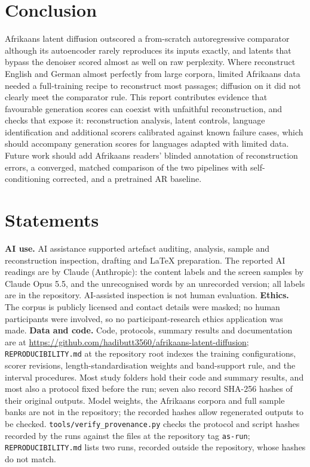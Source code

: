 \documentclass[11pt,a4paper]{article}
\begin{document}
\section{Conclusion}
\label{sec:conclusion}

Afrikaans latent diffusion outscored a from-scratch autoregressive comparator although its autoencoder rarely reproduces its inputs exactly, and latents that bypass the denoiser scored almost as well on raw perplexity. Where \citet{lovelace2023latent} reconstruct English and German almost perfectly from large corpora, limited Afrikaans data needed a full-training recipe to reconstruct most passages; diffusion on it did not clearly meet the comparator rule. This report contributes evidence that favourable generation scores can coexist with unfaithful reconstruction, and checks that expose it: reconstruction analysis, latent controls, language identification and additional scorers calibrated against known failure cases, which should accompany generation scores for languages adapted with limited data. Future work should add Afrikaans readers' blinded annotation of reconstruction errors, a converged, matched comparison of the two pipelines with self-conditioning corrected, and a pretrained AR baseline.

\section*{Statements}
\textbf{AI use.} AI assistance supported artefact auditing, analysis, sample and reconstruction inspection, drafting and LaTeX preparation. The reported AI readings are by Claude (Anthropic): the content labels and the screen samples by Claude Opus 5.5, and the unrecognised words by an unrecorded version; all labels are in the repository. AI-assisted inspection is not human evaluation. \textbf{Ethics.} The corpus is publicly licensed and contact details were masked; no human participants were involved, so no participant-research ethics application was made. \textbf{Data and code.} Code, protocols, summary results and documentation are at \url{https://github.com/hadibutt3560/afrikaans-latent-diffusion}; \texttt{REPRODUCIBILITY.md} at the repository root indexes the training configurations, scorer revisions, length-standardisation weights and band-support rule, and the interval procedures. Most study folders hold their code and summary results, and most also a protocol fixed before the run; seven also record SHA-256 hashes of their original outputs. Model weights, the Afrikaans corpora and full sample banks are not in the repository; the recorded hashes allow regenerated outputs to be checked. \texttt{tools/verify\_provenance.py} checks the protocol and script hashes recorded by the runs against the files at the repository tag \texttt{as-run}; \texttt{REPRODUCIBILITY.md} lists two runs, recorded outside the repository, whose hashes do not match.
\end{document}
